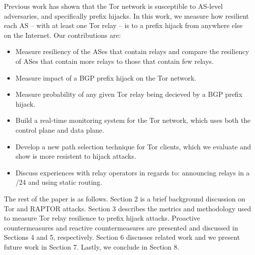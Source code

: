 Previous work has shown that the Tor network is susceptible to AS-level adversaries, and specifically prefix hijacks.  In this work, we measure how resilient each AS -- with at least one Tor relay -- is to a prefix hijack from anywhere else on the Internet.  Our contributions are:

\begin{itemize}
\item Measure resiliency of the ASes that contain relays and compare the resiliency of ASes that contain more relays to those that contain few relays.
\item Measure impact of a BGP prefix hijack on the Tor network.
\item Measure probability of any given Tor relay being decieved by a BGP prefix hijack.
\item Build a real-time monitoring system for the Tor network, which uses both the control plane and data plane.
\item Develop a new path selection technique for Tor clients, which we evaluate and show is more resistent to hijack attacks.
\item Discuss experiences with relay operators in regards to: announcing relays in a /24 and using static routing.
\end{itemize}

The rest of the paper is as follows.  Section 2 is a brief background discussion on Tor and RAPTOR attacks.  Section 3 describes the metrics and methodology used to measure Tor relay resilience to prefix hijack attacks.  Proactive countermeasures and reactive countermeasures are presented and discussed in Sections 4 and 5, respectively.  Section 6 discusses related work and we present future work in Section 7.  Lastly, we conclude in Section 8.
